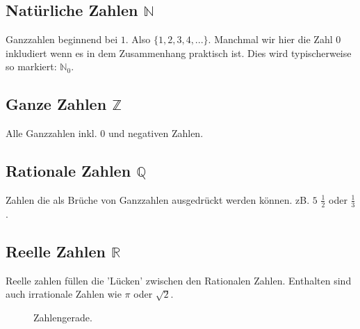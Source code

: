 \subsection{Natürliche Zahlen $\mathbb{N}$}
Ganzzahlen beginnend bei $1$. Also $\{1,2,3,4,...\}$. Manchmal wir hier die Zahl $0$ inkludiert wenn es in dem Zusammenhang praktisch ist. Dies wird typischerweise so markiert: $\mathbb{N}_0$.  
\subsection{Ganze Zahlen $\mathbb{Z}$}
Alle Ganzzahlen inkl. $0$ und negativen Zahlen.
\subsection{Rationale Zahlen $\mathbb{Q}$}
Zahlen die als Brüche von Ganzzahlen ausgedrückt werden können. zB. $5$ $\frac{1}{2}$ oder $\frac{1}{3}$.

\subsection{Reelle Zahlen $\mathbb{R}$}
Reelle zahlen füllen die 'Lücken' zwischen den Rationalen Zahlen. Enthalten sind auch irrationale Zahlen wie $\pi$ oder $\sqrt{2}$.



\begin{figure}[h!]
    \centering
    

    \caption{Zahlengerade.}
    \label{fig:zahlengerade}
\end{figure}


